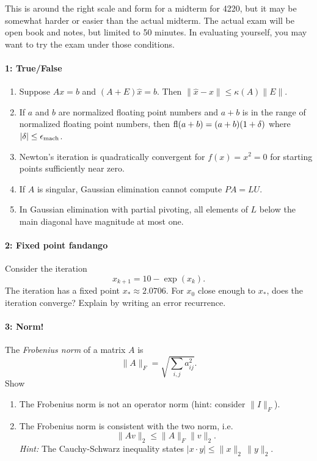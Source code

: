 \documentclass[12pt, leqno]{article}
\begin{document}

This is around the right scale and form for a midterm for 4220, but it may
be somewhat harder or easier than the actual midterm.  The actual exam
will be open book and notes, but limited to 50 minutes.  In evaluating
yourself, you may want to try the exam under those conditions.

\paragraph*{1: True/False}
\begin{enumerate}
\item
  Suppose $Ax = b$ and $(A+E) \hat{x} = b$.
  Then $\|\hat{x}-x\| \leq \kappa(A) \|E\|$.
\item
  If $a$ and $b$ are normalized floating point numbers and $a+b$ is in
  the range of normalized floating point numbers, then
  $\operatorname{fl}(a+b) = (a+b)(1+\delta)$ where $|\delta| \leq \epsilon_{\mathrm{mach}}$.
\item
  Newton's iteration is quadratically convergent for $f(x) = x^2 = 0$
  for starting points sufficiently near zero.
\item
  If $A$ is singular, Gaussian elimination cannot compute $PA = LU$.
\item
  In Gaussian elimination with partial pivoting, all elements of $L$
  below the main diagonal have magnitude at most one.
\end{enumerate}

\paragraph*{2: Fixed point fandango}
Consider the iteration
\[
  x_{k+1} = 10-\exp(x_k).
\]
The iteration has a fixed point $x_* \approx 2.0706$.  For $x_0$
close enough to $x_*$, does the iteration converge?  Explain
by writing an error recurrence.

\paragraph*{3: Norm!}
The {\em Frobenius norm} of a matrix $A$ is
\[
  \|A\|_F = \sqrt{ \sum_{i,j} a_{ij}^2 }.
\]
Show
\begin{enumerate}
\item
  The Frobenius norm is not an operator norm (hint: consider
  $\|I\|_F$).
\item
  The Frobenius norm is consistent with the two norm, i.e.
  \[
    \|Av\|_2 \leq \|A\|_F \|v\|_2.
  \]
  {\em Hint:} The Cauchy-Schwarz inequality states $|x \cdot y| \leq
  \|x\|_2 \, \|y\|_2$.
\end{enumerate}
\end{document}

